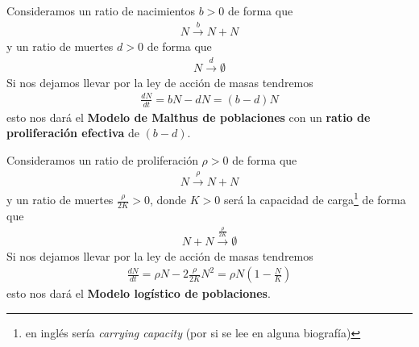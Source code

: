 \documentclass[12pt]{book}
\begin{document}
    \begin{ejemplo}
        Consideramos un ratio de nacimientos $b>0$ de forma que
        \begin{gather*}
            N \overset{b}{\longrightarrow} N + N
        \end{gather*}
        y un ratio de muertes $d>0$ de forma que 
        \begin{gather*}
            N \overset{d}{\longrightarrow} \emptyset
        \end{gather*}
        Si nos dejamos llevar por la ley de acción de masas tendremos
        \begin{gather*}
            \frac{dN}{dt} = bN - dN = (b-d) N
        \end{gather*}
        esto nos dará el \textbf{Modelo de Malthus de poblaciones} con un \textbf{ratio de proliferación efectiva} de $(b-d)$.
    \end{ejemplo}

    \begin{ejemplo}
        Consideramos un ratio de proliferación $\rho>0$ de forma que
        \begin{gather*}
            N \overset{\rho}{\longrightarrow} N + N
        \end{gather*}
        y un ratio de muertes $\frac{\rho}{2K}>0$, donde $K>0$ será la capacidad de carga\footnote{en inglés sería \textit{carrying capacity} (por si se lee en alguna biografía)} de forma que 
        \begin{gather*}
            N + N  \overset{\frac{\rho}{2K}}{\longrightarrow} \emptyset
        \end{gather*}
        Si nos dejamos llevar por la ley de acción de masas tendremos
        \begin{gather*}
            \frac{dN}{dt} = \rho N - 2 \frac{\rho}{2K} N^2 = \rho N \left(1 - \frac{N}{K}\right)
        \end{gather*}
        esto nos dará el \textbf{Modelo logístico de poblaciones}.
    \end{ejemplo}
\end{document}
